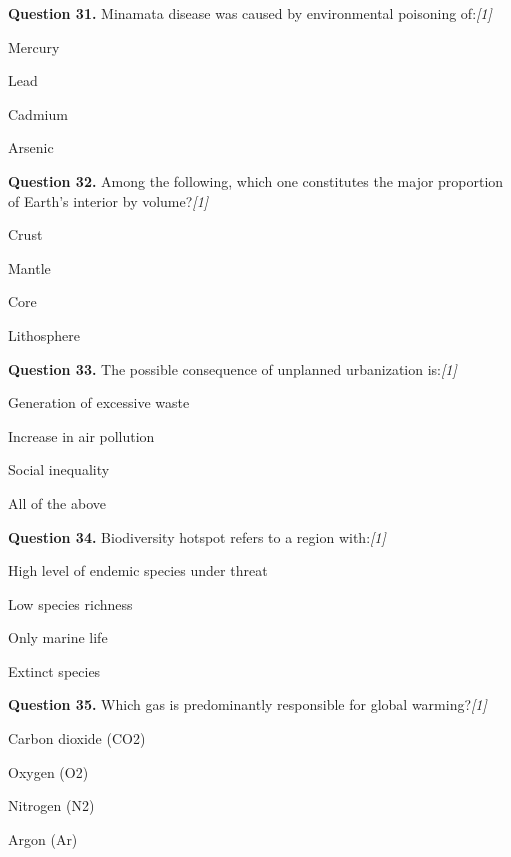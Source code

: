 \documentclass[11pt,a4paper]{article}
\newcommand{\pts}[1]{\hfill   \textit{[#1]}}
\begin{document}
\medskip


\noindent   \textbf{Question 31.} Minamata disease was caused by environmental poisoning of:\pts{1}

\begin{parts}
  \item Mercury
  \item Lead
  \item Cadmium
  \item Arsenic
\end{parts}

\medskip


\noindent   \textbf{Question 32.} Among the following, which one constitutes the major proportion of Earth's interior by volume?\pts{1}

\begin{parts}
  \item Crust
  \item Mantle
  \item Core
  \item Lithosphere
\end{parts}

\medskip


\noindent   \textbf{Question 33.} The possible consequence of unplanned urbanization is:\pts{1}

\begin{parts}
  \item Generation of excessive waste
  \item Increase in air pollution
  \item Social inequality
  \item All of the above
\end{parts}

\medskip


\noindent   \textbf{Question 34.} Biodiversity hotspot refers to a region with:\pts{1}

\begin{parts}
  \item High level of endemic species under threat
  \item Low species richness
  \item Only marine life
  \item Extinct species
\end{parts}

\medskip


\noindent   \textbf{Question 35.} Which gas is predominantly responsible for global warming?\pts{1}

\begin{parts}
  \item Carbon dioxide (CO2)
  \item Oxygen (O2)
  \item Nitrogen (N2)
  \item Argon (Ar)
\end{parts}
\end{document}
